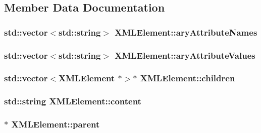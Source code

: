 \subsection{Member Data Documentation}
\hypertarget{class_x_m_l_element_a6c39511e160c6e92a44f047de0609003}{
\subsubsection[{ary\-Attribute\-Names}]{\setlength{\rightskip}{0pt plus 5cm}std\-::vector$<$std\-::string$>$ X\-M\-L\-Element\-::ary\-Attribute\-Names}}\label{class_x_m_l_element_a6c39511e160c6e92a44f047de0609003}
\hypertarget{class_x_m_l_element_aa3bb2a1409e55967e75299ef1c19279e}{
\subsubsection[{ary\-Attribute\-Values}]{\setlength{\rightskip}{0pt plus 5cm}std\-::vector$<$std\-::string$>$ X\-M\-L\-Element\-::ary\-Attribute\-Values}}\label{class_x_m_l_element_aa3bb2a1409e55967e75299ef1c19279e}
\hypertarget{class_x_m_l_element_a09644540f5dd8aeb16544332698ea940}{
\subsubsection[{children}]{\setlength{\rightskip}{0pt plus 5cm}std\-::vector$<${\bf X\-M\-L\-Element} $\ast$$>$$\ast$ X\-M\-L\-Element\-::children}}\label{class_x_m_l_element_a09644540f5dd8aeb16544332698ea940}
\hypertarget{class_x_m_l_element_ac2951cb6eff86940278169d76f7c4ef6}{
\subsubsection[{content}]{\setlength{\rightskip}{0pt plus 5cm}std\-::string X\-M\-L\-Element\-::content}}\label{class_x_m_l_element_ac2951cb6eff86940278169d76f7c4ef6}
\hypertarget{class_x_m_l_element_a6a1caf750f2b2d2b7c6d763b626517cb}{
\subsubsection[{parent}]{$\ast$ X\-M\-L\-Element\-::parent}}\label{class_x_m_l_element_a6a1caf750f2b2d2b7c6d763b626517cb}
